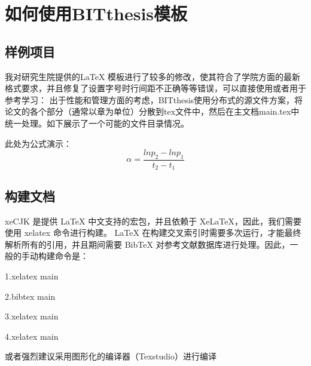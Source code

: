 \chapter{如何使用BITthesis模板}
\section{样例项目}
我对研究生院提供的LaTeX 模板进行了较多的修改，使其符合了学院方面的最新格式要求，并且修复了设置字号时行间距不正确等等错误，可以直接使用或者用于参考学习：
出于性能和管理方面的考虑，BITthesis使用分布式的源文件方案，将论文的各个部分（通常以章为单位）分散到tex文件中，然后在主文档main.tex中统一处理。如下展示了一个可能的文件目录情况。

此处为公式演示：
\begin{equation}
\alpha=\dfrac{lnp_2-lnp_1}{t_2-t_1}\label{eq:zuning}
\end{equation}
\section{构建文档}
xeCJK 是提供 LaTeX 中文支持的宏包，并且依赖于 XeLaTeX，因此，我们需要使用 xelatex 命令进行构建。
LaTeX 在构建交叉索引时需要多次运行，才能最终解析所有的引用，并且期间需要 BibTeX 对参考文献数据库进行处理。因此，一般的手动构建命令是：

1.xelatex main

2.bibtex main

3.xelatex main

4.xelatex main

或者强烈建议采用图形化的编译器（Texstudio）进行编译
